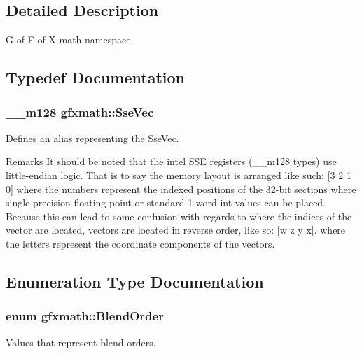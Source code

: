\subsection{Detailed Description}
G of F of X math namespace. 

\subsection{Typedef Documentation}
\hypertarget{namespacegfxmath_a0de2243e2b8d0fd46d3af5e036423004}{}
\subsubsection[{Sse\+Vec}]{\setlength{\rightskip}{0pt plus 5cm}\+\_\+\+\_\+m128 {\bf gfxmath\+::\+Sse\+Vec}}\label{namespacegfxmath_a0de2243e2b8d0fd46d3af5e036423004}


Defines an alias representing the Sse\+Vec. 

\begin{DoxyRemark}{Remarks}
It should be noted that the intel\textregistered{} S\+S\+E registers (\+\_\+\+\_\+m128 types) use little-\/endian logic. That is to say the memory layout is arranged like such\+: \mbox{[}3 2 1 0\mbox{]} where the numbers represent the indexed positions of the 32-\/bit sections where single-\/precision floating point or standard 1-\/word int values can be placed. Because this can lead to some confusion with regards to where the indices of the vector are located, vectors are located in reverse order, like so\+: \mbox{[}w z y x\mbox{]}. where the letters represent the coordinate components of the vectors. 
\end{DoxyRemark}


\subsection{Enumeration Type Documentation}
\hypertarget{namespacegfxmath_ac03f836d004dbed0f2219c54b8e63e3d}{}
\subsubsection[{Blend\+Order}]{\setlength{\rightskip}{0pt plus 5cm}enum {\bf gfxmath\+::\+Blend\+Order}}\label{namespacegfxmath_ac03f836d004dbed0f2219c54b8e63e3d}


Values that represent blend orders. 

